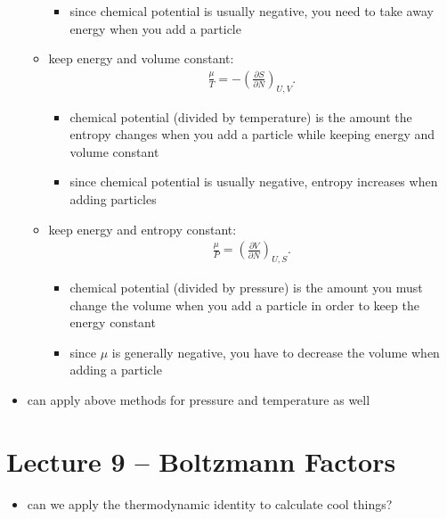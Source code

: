 \documentclass[10pt]{article}
\begin{document}
\begin{itemize}
\begin{itemize}
\begin{itemize}
                    \item since chemical potential is usually negative, you need to take away energy when you add a particle
                \end{itemize}
            \item keep energy and volume constant:
                \begin{gather*}
                    \frac{\mu}{T} = - \left( \frac{\partial S}{\partial N}  \right)_{U,V}
                .\end{gather*}
                \begin{itemize}
                    \item chemical potential (divided by temperature) is the amount the entropy changes when you add a particle while keeping energy and volume constant 
                    \item since chemical potential is usually negative, entropy increases when adding particles
                \end{itemize}
            \item keep energy and entropy constant:
                \begin{gather*}
                    \frac{\mu}{P} = \left( \frac{\partial V}{\partial N}  \right)_{U,S}
                .\end{gather*}
                \begin{itemize}
                    \item chemical potential (divided by pressure) is the amount you must change the volume when you add a particle in order to keep the energy constant
                    \item since $\mu$ is generally negative, you have to decrease the volume when adding a particle
                \end{itemize}
        \end{itemize}
    \item can apply above methods for pressure and temperature as well
\end{itemize}



\section{Lecture 9 -- Boltzmann Factors}
\begin{itemize}
    \item can we apply the thermodynamic identity to calculate cool things?
\end{itemize}
\end{document}

